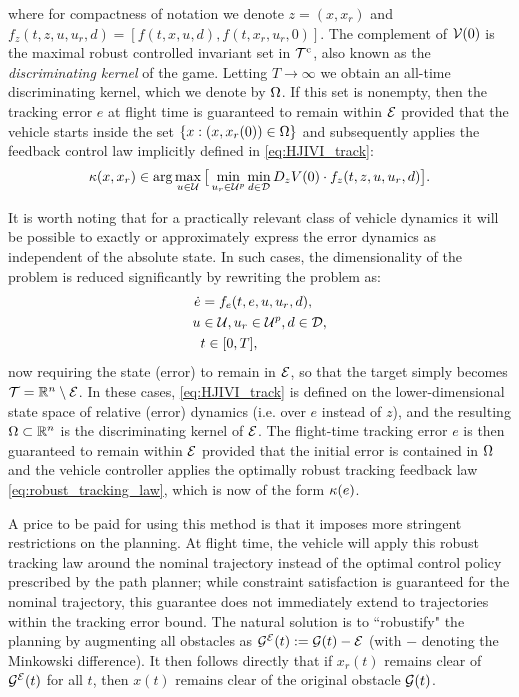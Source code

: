 where for compactness of notation we denote $z=(x,x_r)$ and $f_z(t,z,u,u_r,d) = [f(t,x,u,d),f(t,x_r,u_r,0)]$. The complement of $\mathcal{V}(0)$ is the maximal robust controlled invariant set in $\mathcal{T}^\text{c}$, also known as the \emph{discriminating kernel} of the game. Letting $T\to\infty$ we obtain an all-time discriminating kernel, which we denote by $\Omega$. If this set is nonempty, then the tracking error $e$ at flight time is guaranteed to remain within $\mathcal{E}$ provided that the vehicle starts inside the set $\{x: (x,x_r(0))\in\Omega\}$ and subsequently applies the feedback control law implicitly defined in \eqref{eq:HJIVI_track}:
\begin{equation}\label{eq:robust_tracking_law}
\kappa(x,x_r) \in \arg\max_{u \in \mathcal{U}} \big[\min_{u_r \in\mathcal{U}^p} \min_{d \in \mathcal{D}} D_z V(0) \cdot f_z(t,z,u,u_r,d)\big].
\end{equation}

It is worth noting that for a practically relevant class of vehicle dynamics it will be possible to exactly or approximately express the error dynamics as independent of the absolute state. In such cases, the dimensionality of the problem is reduced significantly by rewriting the problem as:
\begin{equation}
\label{eq:edyn} %
\begin{aligned}
\dot{e} &= f_e(t, e, u, u_r,d), \\
u &\in \cset, u_r\in\cset^p, d \in \dset, \\
&t \in [0, T],
\end{aligned}
\end{equation}
now requiring the state (error) to remain in $\mathcal{E}$, so that the target simply becomes $\mathcal{T} = \mathbb{R}^n \setminus \mathcal{E}$. In these cases, \eqref{eq:HJIVI_track} is defined on the lower-dimensional state space of relative (error) dynamics (i.e. over $e$ instead of $z$), and the resulting $\Omega\subset \mathbb{R}^n$ is the discriminating kernel of $\mathcal{E}$. The flight-time tracking error $e$ is then guaranteed to remain within $\mathcal{E}$ provided that the initial error is contained in $\Omega$ and the vehicle controller applies the optimally robust tracking feedback law \eqref{eq:robust_tracking_law}, which is now of the form $\kappa(e)$.

A price to be paid for using this method is that it imposes more stringent restrictions on the planning. At flight time, the vehicle will apply this robust tracking law around the nominal trajectory instead of the optimal control policy prescribed by the path planner; while constraint satisfaction is guaranteed for the nominal trajectory, this guarantee does not immediately extend to trajectories within the tracking error bound. The natural solution is to ``robustify" the planning by augmenting all obstacles as $\mathcal{G}^{\mathcal{E}}(t) := \mathcal{G}(t) - \mathcal{E}$ (with $-$ denoting the Minkowski difference). It then follows directly that if $x_r(t)$ remains clear of $\mathcal{G}^{\mathcal{E}}(t)$ for all $t$, then $x(t)$ remains clear of the original obstacle $\mathcal{G}(t)$.

